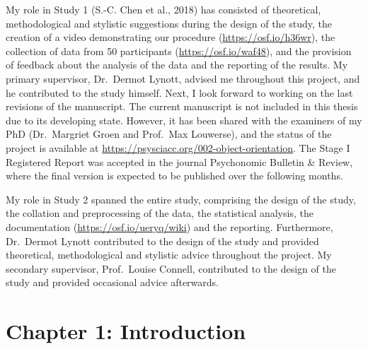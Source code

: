 \documentclass[
  12pt,
  man,floatsintext]{apa7}
\begin{document}
My role in Study 1 (S.-C. Chen et al., 2018) has consisted of theoretical, methodological and stylistic suggestions during the design of the study, the creation of a video demonstrating our procedure (\url{https://osf.io/h36wr}), the collection of data from 50 participants (\url{https://osf.io/waf48}), and the provision of feedback about the analysis of the data and the reporting of the results. My primary supervisor, Dr.~Dermot Lynott, advised me throughout this project, and he contributed to the study himself. Next, I look forward to working on the last revisions of the manuscript. The current manuscript is not included in this thesis due to its developing state. However, it has been shared with the examiners of my PhD (Dr.~Margriet Groen and Prof.~Max Louwerse), and the status of the project is available at \url{https://psysciacc.org/002-object-orientation}. The Stage I Registered Report was accepted in the journal Psychonomic Bulletin \& Review, where the final version is expected to be published over the following months.

My role in Study 2 spanned the entire study, comprising the design of the study, the collation and preprocessing of the data, the statistical analysis, the documentation (\url{https://osf.io/ueryq/wiki}) and the reporting. Furthermore, Dr.~Dermot Lynott contributed to the design of the study and provided theoretical, methodological and stylistic advice throughout the project. My secondary supervisor, Prof.~Louise Connell, contributed to the design of the study and provided occasional advice afterwards.

\newpage

\hypertarget{chapter-1-introduction}{%
\section{Chapter 1: Introduction}\label{chapter-1-introduction}}
\end{document}
